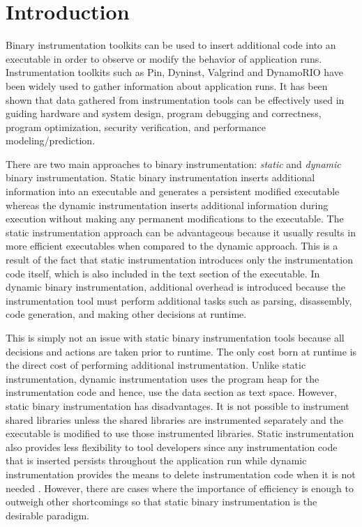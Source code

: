 \section{Introduction}
\label{sec:Introduction}

Binary instrumentation toolkits can be used to insert additional code into an
executable in order to observe or modify the behavior of application runs.
Instrumentation toolkits such as Pin\cite{luk2005pin},
Dyninst\cite{buck2000api}, Valgrind\cite{nethercote2007valgrind} and
DynamoRIO\cite{bruening2004efficient} have been widely used to gather
information about application runs. It has been shown that data gathered from
instrumentation tools can be effectively used in guiding hardware and system
design\cite{uhlig1997trace}, program debugging and
correctness\cite{nethercote2007shadow}, program
optimization\cite{romer1997instrumentation}, security
verification\cite{miller-playing}, and performance
modeling/prediction\cite{snavely2001modeling}.

There are two main approaches to binary instrumentation: \textit{static} and
\textit{dynamic} binary instrumentation. Static binary instrumentation inserts
additional information into an executable and generates a persistent modified
executable whereas the dynamic instrumentation inserts additional information
during execution without making any permanent modifications to the executable.
The static instrumentation approach can be advantageous because it usually
results in more efficient executables when compared to the dynamic approach.
This is a result of the fact that static instrumentation introduces only the
instrumentation code itself, which is also included in the text section of the
executable. In dynamic binary instrumentation, additional overhead is introduced
because the instrumentation tool must perform additional tasks such as parsing,
disassembly, code generation, and making other decisions at runtime.

This is simply not an issue with static binary instrumentation tools because all
decisions and actions are taken prior to runtime. The only cost born at runtime
is the direct cost of performing additional instrumentation. Unlike static
instrumentation, dynamic instrumentation uses the program heap for the
instrumentation code and hence, use the data section as text space. However,
static binary instrumentation has disadvantages. It is not possible to
instrument shared libraries unless the shared libraries are instrumented
separately and the executable is modified to use those instrumented libraries.
Static instrumentation also provides less flexibility to tool developers since
any instrumentation code that is inserted persists throughout the application
run while dynamic instrumentation provides the means to delete instrumentation
code when it is not needed \cite{tikir2002efficient}. However, there are cases
where the importance of efficiency is enough to outweigh other shortcomings
\cite{carrington2006performance} so that static binary instrumentation is the
desirable paradigm.   

